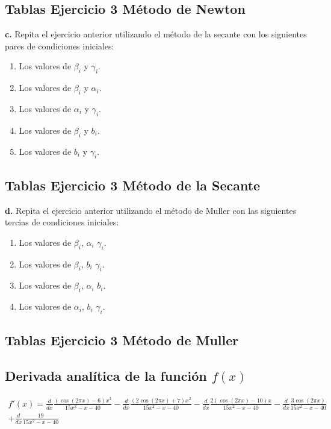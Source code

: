 \documentclass{article} %
\begin{document}
\subsection*{Tablas Ejercicio 3 Método de Newton}


\textbf{c.} Repita el ejercicio anterior utilizando el método de la secante con los siguientes pares de condiciones iniciales:

\begin{enumerate}
    \item Los valores de $\beta_i$ y $\gamma_i$.
    \item Los valores de $\beta_i$ y $\alpha_i$.
    \item Los valores de $\alpha_i$ y $\gamma_i$.
    \item Los valores de $\beta_i$ y $b_i$.
    \item Los valores de $b_i$ y $\gamma_i$.
\end{enumerate}

\subsection*{Tablas Ejercicio 3 Método de la Secante}


\textbf{d.} Repita el ejercicio anterior utilizando el método de Muller con las siguientes tercias de condiciones iniciales:

\begin{enumerate}
    \item Los valores de $\beta_i$, $\alpha_i$ $\gamma_i$.
    \item Los valores de $\beta_i$, $b_i$ $\gamma_i$.
    \item Los valores de $\beta_i$, $\alpha_i$ $b_i$.
    \item Los valores de $\alpha_i$, $b_i$ $\gamma_i$.
\end{enumerate}


\subsection*{Tablas Ejercicio 3 Método de Muller}


\subsection*{Derivada analítica de la función $f(x)$}

\begin{gather*}
    f'(x) = \frac{d}{dx} \frac{(\cos{(2\pi x)}-6)x^3}{15x^2-x-40} - \frac{d}{dx} \frac{(2\cos{(2\pi x)}+7)x^2}{15x^2-x-40} - \frac{d}{dx} \frac{2(\cos{(2\pi x)}-10)x}{15x^2-x-40} - \frac{d}{dx} \frac{3\cos{(2\pi x)}}{15x^2-x-40}\\
    + \frac{d}{dx} \frac{19}{15x^2-x-40}
\end{gather*}
\end{document}
